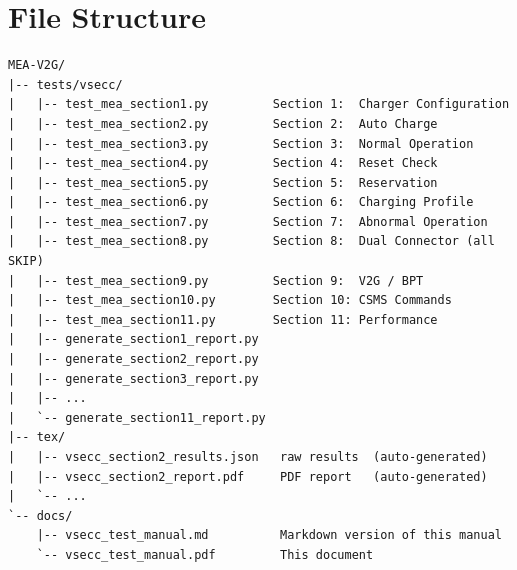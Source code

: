 \documentclass[11pt, a4paper]{article}
\begin{document}
\newpage
\section{File Structure}

\begin{lstlisting}
MEA-V2G/
|-- tests/vsecc/
|   |-- test_mea_section1.py         Section 1:  Charger Configuration
|   |-- test_mea_section2.py         Section 2:  Auto Charge
|   |-- test_mea_section3.py         Section 3:  Normal Operation
|   |-- test_mea_section4.py         Section 4:  Reset Check
|   |-- test_mea_section5.py         Section 5:  Reservation
|   |-- test_mea_section6.py         Section 6:  Charging Profile
|   |-- test_mea_section7.py         Section 7:  Abnormal Operation
|   |-- test_mea_section8.py         Section 8:  Dual Connector (all SKIP)
|   |-- test_mea_section9.py         Section 9:  V2G / BPT
|   |-- test_mea_section10.py        Section 10: CSMS Commands
|   |-- test_mea_section11.py        Section 11: Performance
|   |-- generate_section1_report.py
|   |-- generate_section2_report.py
|   |-- generate_section3_report.py
|   |-- ...
|   `-- generate_section11_report.py
|-- tex/
|   |-- vsecc_section2_results.json   raw results  (auto-generated)
|   |-- vsecc_section2_report.pdf     PDF report   (auto-generated)
|   `-- ...
`-- docs/
    |-- vsecc_test_manual.md          Markdown version of this manual
    `-- vsecc_test_manual.pdf         This document
\end{lstlisting}
\end{document}
